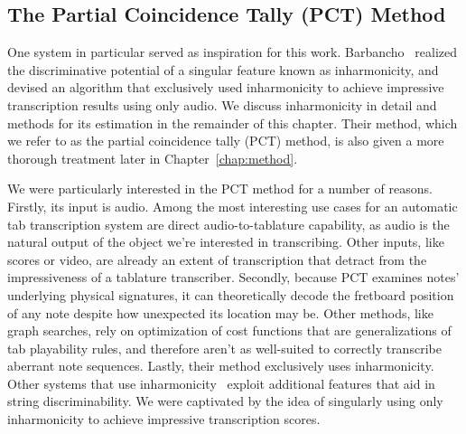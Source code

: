 \documentclass[12pt]{cmuthesis}
\begin{document}
\subsection{The Partial Coincidence Tally (PCT) Method}
One system in particular served as inspiration for this work. Barbancho~\cite{barbanchoi2012} realized the discriminative potential of a singular feature known as inharmonicity, and devised an algorithm that exclusively used inharmonicity to achieve impressive transcription results using only audio. We discuss inharmonicity in detail and methods for its estimation in the remainder of this chapter. Their method, which we refer to as the partial coincidence tally (PCT) method, is also given a more thorough treatment later in Chapter~\ref{chap:method}.

We were particularly interested in the PCT method for a number of reasons. Firstly, its input is audio. Among the most interesting use cases for an automatic tab transcription system are direct audio-to-tablature capability, as audio is the natural output of the object we're interested in transcribing. Other inputs, like scores or video, are already an extent of transcription that detract from the impressiveness of a tablature transcriber. Secondly, because PCT examines notes' underlying physical signatures, it can theoretically decode the fretboard position of any note despite how unexpected its location may be. Other methods, like graph searches, rely on optimization of cost functions that are generalizations of tab playability rules, and therefore aren't as well-suited to correctly transcribe aberrant note sequences. Lastly, their method exclusively uses inharmonicity. Other systems that use inharmonicity~\cite{barbancho2009,abesser2012,dittmar2013,kehling2014} exploit additional features that aid in string discriminability. We were captivated by the idea of singularly using only inharmonicity to achieve impressive transcription scores.
\end{document}
